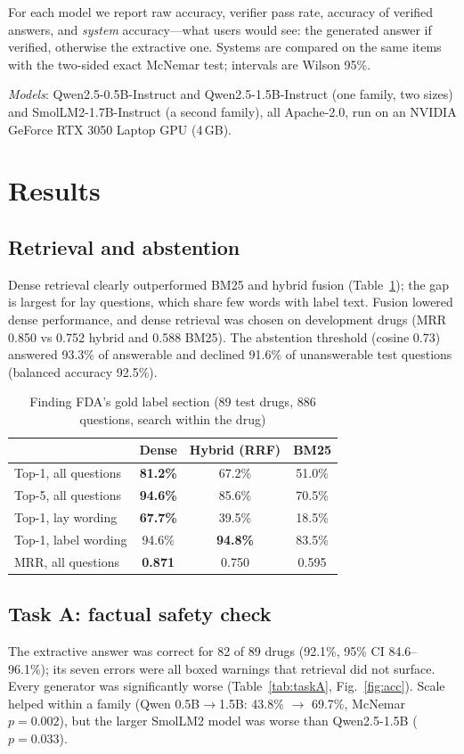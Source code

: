 \documentclass[conference]{IEEEtran}
\begin{document}
For each model we report raw accuracy, verifier pass rate, accuracy of verified answers, and \emph{system} accuracy---what users would see: the generated answer if verified, otherwise the extractive one. Systems are compared on the same items with the two-sided exact McNemar test; intervals are Wilson 95\%.

\emph{Models}: Qwen2.5-0.5B-Instruct and Qwen2.5-1.5B-Instruct \cite{qwen2024qwen25} (one family, two sizes) and SmolLM2-1.7B-Instruct \cite{allal2025smollm2} (a second family), all Apache-2.0, run on an NVIDIA GeForce RTX 3050 Laptop GPU (4\,GB).

\section{Results}
\subsection{Retrieval and abstention}
Dense retrieval clearly outperformed BM25 and hybrid fusion (Table~\ref{tab:retrieval}); the gap is largest for lay questions, which share few words with label text. Fusion lowered dense performance, and dense retrieval was chosen on development drugs (MRR 0.850 vs 0.752 hybrid and 0.588 BM25). The abstention threshold (cosine 0.73) answered 93.3\% of answerable and declined 91.6\% of unanswerable test questions (balanced accuracy 92.5\%).

\begin{table}[t]
\caption{Finding FDA's gold label section (89 test drugs, 886 questions, search within the drug)}
\label{tab:retrieval}
\centering
\begin{tabular}{lccc}
\toprule
 & Dense & Hybrid (RRF) & BM25 \\
\midrule
Top-1, all questions & \textbf{81.2\%} & 67.2\% & 51.0\% \\
Top-5, all questions & \textbf{94.6\%} & 85.6\% & 70.5\% \\
Top-1, lay wording & \textbf{67.7\%} & 39.5\% & 18.5\% \\
Top-1, label wording & 94.6\% & \textbf{94.8\%} & 83.5\% \\
MRR, all questions & \textbf{0.871} & 0.750 & 0.595 \\
\bottomrule
\end{tabular}
\end{table}

\subsection{Task A: factual safety check}
The extractive answer was correct for 82 of 89 drugs (92.1\%, 95\% CI 84.6--96.1\%); its seven errors were all boxed warnings that retrieval did not surface. Every generator was significantly worse (Table~\ref{tab:taskA}, Fig.~\ref{fig:acc}). Scale helped within a family (Qwen 0.5B$\to$1.5B: 43.8\% $\to$ 69.7\%, McNemar $p=0.002$), but the larger SmolLM2 model was worse than Qwen2.5-1.5B ($p=0.033$).
\end{document}
